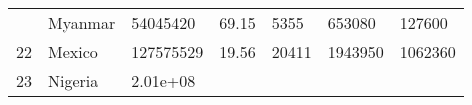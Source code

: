 \documentclass[
]{article}
\begin{document}
\begin{longtable}[]{@{}lllllll@{}}
\begin{minipage}[t]{0.06\columnwidth}
\end{minipage} & \begin{minipage}[t]{0.15\columnwidth}\raggedright
Myanmar\strut
\end{minipage} & \begin{minipage}[t]{0.13\columnwidth}\raggedright
54045420\strut
\end{minipage} & \begin{minipage}[t]{0.13\columnwidth}\raggedright
69.15\strut
\end{minipage} & \begin{minipage}[t]{0.09\columnwidth}\raggedright
5355\strut
\end{minipage} & \begin{minipage}[t]{0.12\columnwidth}\raggedright
653080\strut
\end{minipage} & \begin{minipage}[t]{0.12\columnwidth}\raggedright
127600\strut
\end{minipage}\tabularnewline
\begin{minipage}[t]{0.06\columnwidth}\raggedright
22\strut
\end{minipage} & \begin{minipage}[t]{0.15\columnwidth}\raggedright
Mexico\strut
\end{minipage} & \begin{minipage}[t]{0.13\columnwidth}\raggedright
127575529\strut
\end{minipage} & \begin{minipage}[t]{0.13\columnwidth}\raggedright
19.56\strut
\end{minipage} & \begin{minipage}[t]{0.09\columnwidth}\raggedright
20411\strut
\end{minipage} & \begin{minipage}[t]{0.12\columnwidth}\raggedright
1943950\strut
\end{minipage} & \begin{minipage}[t]{0.12\columnwidth}\raggedright
1062360\strut
\end{minipage}\tabularnewline
\begin{minipage}[t]{0.06\columnwidth}\raggedright
23\strut
\end{minipage} & \begin{minipage}[t]{0.15\columnwidth}\raggedright
Nigeria\strut
\end{minipage} & \begin{minipage}[t]{0.13\columnwidth}\raggedright
2.01e+08\strut
\end{minipage} & \begin{minipage}[t]{0.13\columnwidth}\raggedright

\end{minipage}
\end{longtable}
\end{document}
